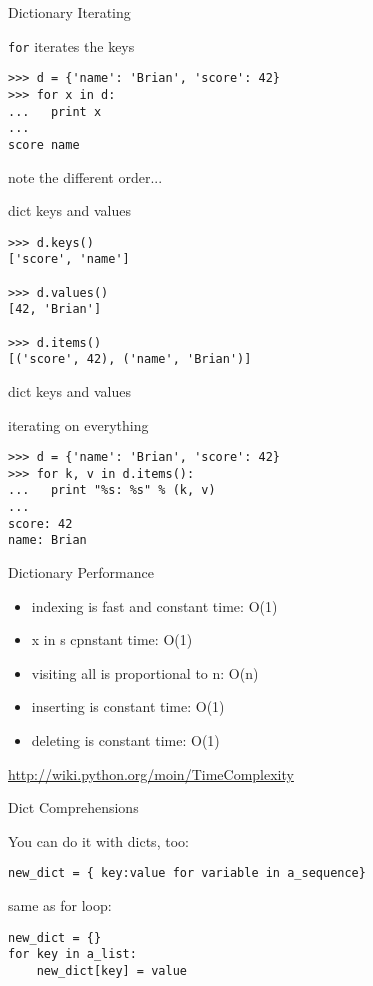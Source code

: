 \documentclass{beamer}
\begin{document}
\begin{frame}[fragile]{Dictionary Iterating}

{\Large \verb|for| iterates the keys}
\vfill
\begin{verbatim}
>>> d = {'name': 'Brian', 'score': 42}
>>> for x in d:
...   print x
...
score name
\end{verbatim}
\vfill
{note the different order...}
\end{frame}

\begin{frame}[fragile]{dict keys and values}

\vfill
\begin{verbatim}
>>> d.keys()
['score', 'name']

>>> d.values()
[42, 'Brian']

>>> d.items()
[('score', 42), ('name', 'Brian')]
\end{verbatim}
\vfill
\end{frame}

\begin{frame}[fragile]{dict keys and values}

{\Large iterating on everything}
\vfill
\begin{verbatim}
>>> d = {'name': 'Brian', 'score': 42}
>>> for k, v in d.items():
...   print "%s: %s" % (k, v)
...
score: 42
name: Brian
\end{verbatim}
\vfill
\end{frame}

\begin{frame}[fragile]{Dictionary Performance }

\begin{itemize}
  \item indexing is fast and constant time: O(1)
  \item x in s cpnstant time: O(1)
  \item visiting all is proportional to n: O(n)
  \item inserting is constant time: O(1)
  \item deleting is constant time: O(1)
\end{itemize}

\vfill
\url{ http://wiki.python.org/moin/TimeComplexity}

\end{frame} 

\begin{frame}[fragile]{Dict Comprehensions}

{\Large You can do it with dicts, too:}

\begin{verbatim}
new_dict = { key:value for variable in a_sequence}
\end{verbatim}

{\Large same as for loop:}

\begin{verbatim}
new_dict = {}
for key in a_list:
    new_dict[key] = value
\end{verbatim}

\end{frame} 
\end{document}
